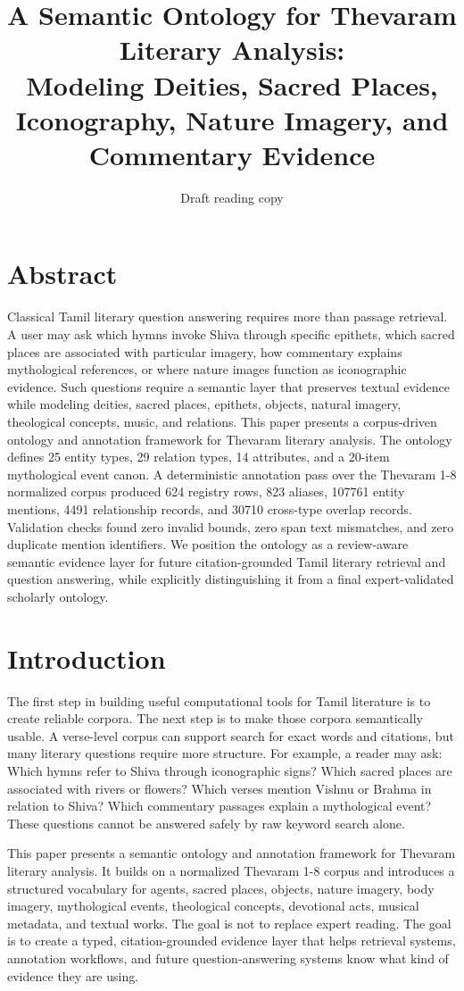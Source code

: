 \documentclass[11pt]{article}
\title{\textbf{A Semantic Ontology for Thevaram Literary Analysis:\\Modeling Deities, Sacred Places, Iconography, Nature Imagery, and Commentary Evidence}}
\author{Draft reading copy}
\date{}
\begin{document}
\maketitle

\section*{Abstract}
Classical Tamil literary question answering requires more than passage retrieval. A user may ask which hymns invoke Shiva through specific epithets, which sacred places are associated with particular imagery, how commentary explains mythological references, or where nature images function as iconographic evidence. Such questions require a semantic layer that preserves textual evidence while modeling deities, sacred places, epithets, objects, natural imagery, theological concepts, music, and relations. This paper presents a corpus-driven ontology and annotation framework for Thevaram literary analysis. The ontology defines 25 entity types, 29 relation types, 14 attributes, and a 20-item mythological event canon. A deterministic annotation pass over the Thevaram 1-8 normalized corpus produced 624 registry rows, 823 aliases, 107761 entity mentions, 4491 relationship records, and 30710 cross-type overlap records. Validation checks found zero invalid bounds, zero span text mismatches, and zero duplicate mention identifiers. We position the ontology as a review-aware semantic evidence layer for future citation-grounded Tamil literary retrieval and question answering, while explicitly distinguishing it from a final expert-validated scholarly ontology.

\section{Introduction}
The first step in building useful computational tools for Tamil literature is to create reliable corpora. The next step is to make those corpora semantically usable. A verse-level corpus can support search for exact words and citations, but many literary questions require more structure. For example, a reader may ask: Which hymns refer to Shiva through iconographic signs? Which sacred places are associated with rivers or flowers? Which verses mention Vishnu or Brahma in relation to Shiva? Which commentary passages explain a mythological event? These questions cannot be answered safely by raw keyword search alone.

This paper presents a semantic ontology and annotation framework for Thevaram literary analysis. It builds on a normalized Thevaram 1-8 corpus and introduces a structured vocabulary for agents, sacred places, objects, nature imagery, body imagery, mythological events, theological concepts, devotional acts, musical metadata, and textual works. The goal is not to replace expert reading. The goal is to create a typed, citation-grounded evidence layer that helps retrieval systems, annotation workflows, and future question-answering systems know what kind of evidence they are using.
\end{document}
